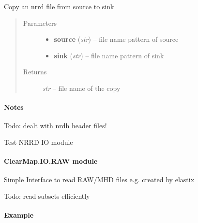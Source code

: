 \documentclass[letterpaper,10pt,english]{sphinxmanual}
\begin{document}

\begin{fulllineitems}
\label{api/ClearMap.IO:ClearMap.IO.NRRD.copyData}
Copy an nrrd file from source to sink
\begin{quote}\begin{description}
\item[{Parameters}] \leavevmode\begin{itemize}
\item {} 
\textbf{source} (\emph{str}) --
file name pattern of source

\item {} 
\textbf{sink} (\emph{str}) --
file name pattern of sink

\end{itemize}

\item[{Returns}] \leavevmode
\emph{str} --
file name of the copy

\end{description}\end{quote}
\paragraph{Notes}

Todo: dealt with nrdh header files!

\end{fulllineitems}


\begin{fulllineitems}
\label{api/ClearMap.IO:ClearMap.IO.NRRD.test}
Test NRRD IO module

\end{fulllineitems}



\paragraph{ClearMap.IO.RAW module}
\label{api/ClearMap.IO:clearmap-io-raw-module}\label{api/ClearMap.IO:module-ClearMap.IO.RAW}
Simple Interface to read RAW/MHD files e.g. created by elastix

Todo: read subsets efficiently
\paragraph{Example}
\end{document}
